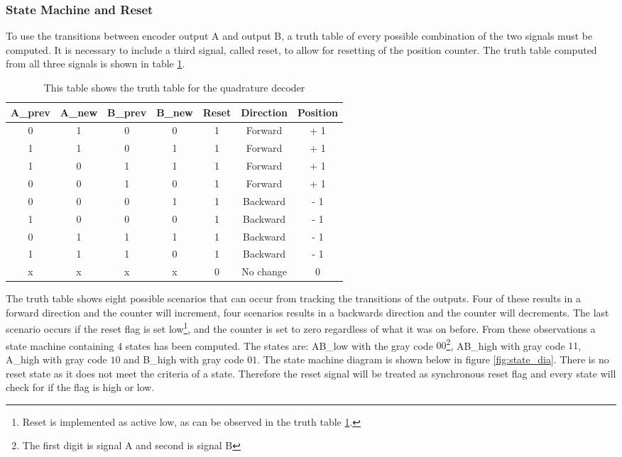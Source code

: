 \documentclass[../../../main]{subfiles}
\begin{document}
\subsubsection{State Machine and Reset}
\label{subsubsec:reset_state}
To use the transitions between encoder output A and output B, a truth table of every possible combination of the two signals must be computed. It is necessary to include a third signal, called reset, to allow for resetting of the position counter. The truth table computed from all three signals is shown in table \ref{fig:truth_table}.
\begin{table}[H]
  \centering
  \begin{tabular}{|c | c | c | c | c | c |c|}
  \hline
   A\_prev & A\_new & B\_prev & B\_new & Reset & Direction & Position \\
   \hline
   0 & 1 & 0 & 0 & 1 & Forward & + 1 \\
   1 & 1 & 0 & 1 & 1 & Forward & + 1 \\
   1 & 0 & 1 & 1 & 1 & Forward & + 1 \\
   0 & 0 & 1 & 0 & 1 & Forward & + 1 \\
   0 & 0 & 0 & 1 & 1 & Backward & - 1 \\
   1 & 0 & 0 & 0 & 1 & Backward & - 1 \\
   0 & 1 & 1 & 1 & 1 & Backward & - 1 \\
   1 & 1 & 1 & 0 & 1 & Backward & - 1 \\
   x & x & x & x & 0 & No change &  0 \\
   \hline
  \end{tabular}
  \caption{This table shows the truth table for the quadrature decoder}
  \label{fig:truth_table}
\end{table}
The truth table shows eight possible scenarios that can occur from tracking the transitions of the outputs. Four of these results in a forward direction and the counter will increment, four scenarios results in a backwards direction and the counter will decrements. The last scenario occurs if the reset flag is set low\footnote{Reset is implemented as active low, as can be observed in the truth table \ref{fig:truth_table}.}, and the counter is set to zero regardless of what it was on before. From these observations a state machine containing 4 states has been computed. The states are: AB\_low with the gray code $00$\footnote{The first digit is signal A and second is signal B}, AB\_high with gray code $11$, A\_high with gray code $10$ and B\_high with gray code $01$. The state machine diagram is shown below in figure \ref{fig:state_dia}.  There is no reset state as it does not meet the criteria of a state. Therefore the reset signal will be treated as synchronous reset flag and every state will check for if the flag is high or low. \\
\end{document}
